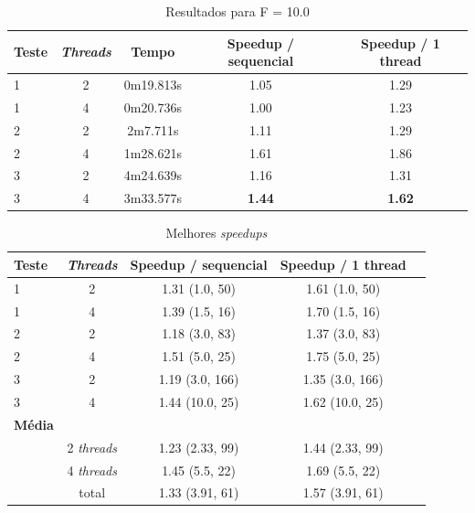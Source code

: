 \documentclass[12pt]{article}
\begin{document}
\begin{table}[H]
  \begin{center}
    \begin{tabular}{ | l | c | c | c | c |}
      \hline
      \textbf{Teste} & \textbf{\textit{Threads}} & \textbf{Tempo} & \textbf{Speedup / sequencial} & \textbf{Speedup / 1 thread}\\ \hline
      1 & 2 & 0m19.813s & 1.05 & 1.29 \\ \hline
      1 & 4 & 0m20.736s & 1.00 & 1.23 \\ \hline
      2 & 2 & 2m7.711s & 1.11 & 1.29 \\ \hline
      2 & 4 & 1m28.621s & 1.61 & 1.86 \\ \hline
      3 & 2 & 4m24.639s & 1.16 & 1.31 \\ \hline
      3 & 4 & 3m33.577s & \textbf{1.44} & \textbf{1.62} \\ \hline
  \end{tabular}
  \caption{Resultados para F = 10.0}
  \label{tbl:resultados10}
  \end{center}
\end{table}

\begin{table}[H]
  \begin{center}
    \begin{tabular}{ | l | c | c | c | c |}
      \hline
      \textbf{Teste} & \textbf{\textit{Threads}} & \textbf{Speedup / sequencial} & \textbf{Speedup / 1 thread}\\ \hline
      1 & 2 & 1.31 (1.0, 50) & 1.61 (1.0, 50) \\ \hline
      1 & 4 & 1.39 (1.5, 16) & 1.70 (1.5, 16) \\ \hline
      2 & 2 & 1.18 (3.0, 83) & 1.37 (3.0, 83) \\ \hline
      2 & 4 & 1.51 (5.0, 25) & 1.75 (5.0, 25) \\ \hline
      3 & 2 & 1.19 (3.0, 166) & 1.35 (3.0, 166) \\ \hline
      3 & 4 & 1.44 (10.0, 25) & 1.62 (10.0, 25) \\ \hline \hline
      \textbf{Média} & & & \\ \hline
      & 2 \textit{threads} & 1.23 (2.33, 99) & 1.44 (2.33, 99) \\ \hline
      & 4 \textit{threads} & 1.45 (5.5, 22) & 1.69 (5.5, 22) \\ \hline
      & total & 1.33 (3.91, 61) & 1.57 (3.91, 61) \\ \hline  
  \end{tabular}
  \caption{Melhores \textit{speedups}}
  \label{tbl:best_results}
  \end{center}
\end{table}
\end{document}
